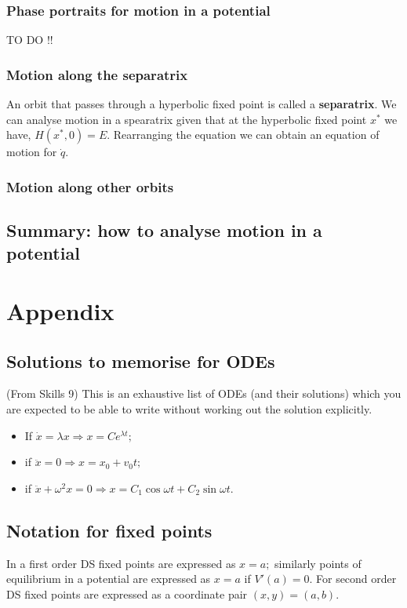 \documentclass[12pt, a4paper]{article}
\newcommand{\imply}{\Rightarrow}
\theoremstyle{definition}
\theoremstyle{plain}
\begin{document}
\subsubsection{Phase portraits for motion in a potential}

TO DO !!

\subsubsection{Motion along the separatrix}

An orbit that passes through a hyperbolic fixed point is called a \textbf{separatrix}. We can analyse motion in a spearatrix given that at the hyperbolic fixed point $x^*$ we have, $H(x^*,0)=E.$ Rearranging the equation we can obtain an equation of motion for $\dot{q}.$

\subsubsection{Motion along other orbits}

\subsection{Summary: how to analyse motion in a potential}



\section{Appendix}

\subsection{Solutions to memorise for ODEs}

(From Skills 9) This is an exhaustive list of ODEs (and their solutions) which you are expected to be able to write without working out the solution explicitly.
\begin{itemize}

	\item If $\dot{x} = \lambda x \imply x=Ce^{\lambda t};$

	\item if $\ddot{x}=0 \imply x=x_0+v_0t;$

	\item if $\ddot{x}+\omega^2x=0 \imply x=C_1\cos{\omega t}+C_2\sin{\omega t}.$

\end{itemize}

\subsection{Notation for fixed points}

In a first order DS fixed points are expressed as $x=a;$ similarly points of equilibrium in a potential are expressed as $x=a$ if $V'(a)=0.$ For second order DS fixed points are expressed as a coordinate pair $(x,y)=(a,b).$
\end{document}

